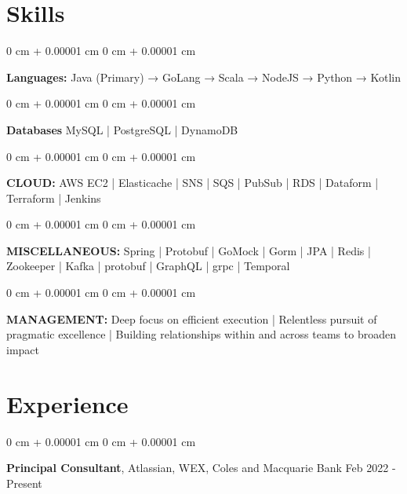 \documentclass[10pt, letterpaper]{article}
\newenvironment{onecolentry}{
    \begin{adjustwidth}{
        0 cm + 0.00001 cm
    }{
        0 cm + 0.00001 cm
    }
}{
    \end{adjustwidth}
} %
\newenvironment{twocolentry}[2][]{
    \onecolentry
    \def\secondColumn{#2}
    \setcolumnwidth{\fill, 4.5 cm}
    \begin{paracol}{2}
}{
    \switchcolumn \raggedleft \secondColumn
    \end{paracol}
    \endonecolentry
} %
\begin{document}
    \section{Skills}
        \begin{onecolentry}
            \textbf{Languages:} Java (Primary) → GoLang → Scala → NodeJS → Python → Kotlin
        \end{onecolentry}
        \begin{onecolentry}
            \textbf{Databases} MySQL | PostgreSQL | DynamoDB
        \end{onecolentry}
        \begin{onecolentry}
            \textbf{CLOUD:} AWS EC2 | Elasticache | SNS | SQS | PubSub | RDS | Dataform | Terraform | Jenkins
        \end{onecolentry}
        \begin{onecolentry}
            \textbf{MISCELLANEOUS:} Spring | Protobuf | GoMock | Gorm | JPA | Redis | Zookeeper | Kafka | protobuf | GraphQL | grpc | Temporal
        \end{onecolentry}
        \begin{onecolentry}
            \textbf{MANAGEMENT:} Deep focus on efficient execution | Relentless pursuit of pragmatic excellence | Building relationships within and across teams to broaden impact
        \end{onecolentry}
    
    \section{Experience}
        \vspace{0.15 cm}
        \begin{twocolentry}{
            Feb 2022 - Present
        }
        \textbf{Principal Consultant}, Atlassian, WEX, Coles and Macquarie Bank\end{twocolentry}
\end{document}
